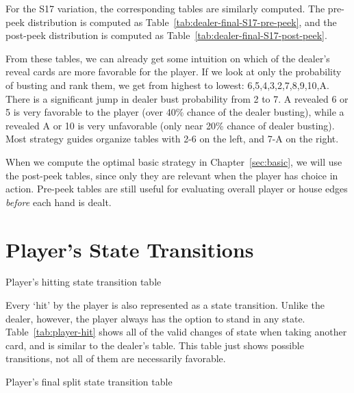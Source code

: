 For the S17 variation, the corresponding tables are similarly computed.
The pre-peek distribution is computed as 
Table~\ref{tab:dealer-final-S17-pre-peek}, 
and the post-peek distribution is computed as 
Table~\ref{tab:dealer-final-S17-post-peek}.

From these tables, we can already get some intuition on
which of the dealer's reveal cards are more favorable for the player.
If we look at only the probability of busting and rank them, 
we get from highest to lowest: 6,5,4,3,2,7,8,9,10,A.
There is a significant jump in dealer bust probability from 2 to 7.  
A revealed 6 or 5 is very favorable to the player (over 40\% chance of 
the dealer busting), 
while a revealed A or 10 is very unfavorable 
(only near 20\% chance of dealer busting).
Most strategy guides organize tables with 2-6 on the left, 
and 7-A on the right.

When we compute the optimal basic strategy in Chapter~\ref{sec:basic}, 
we will use the post-peek tables, since only they are relevant
when the player has choice in action.  
Pre-peek tables are still useful for evaluating overall player or house
edges \emph{before} each hand is dealt.

\section{Player's State Transitions}
\label{sec:rules:player-hit}

\begin{table}[ht!]
\caption{Player's hitting state transition table}
\begin{center}

\end{center}
\label{tab:player-hit}
\end{table}

Every `hit' by the player is also represented as a state transition.
Unlike the dealer, however, the player always has the option
to stand in any state.
Table~\ref{tab:player-hit} shows all of the valid changes of state
when taking another card, and is similar to the dealer's table.
This table just shows possible transitions, 
not all of them are necessarily favorable.

\begin{table}[ht!]
\caption{Player's final split state transition table}
\begin{center}

\end{center}
\label{tab:player-final-split}
\end{table}

